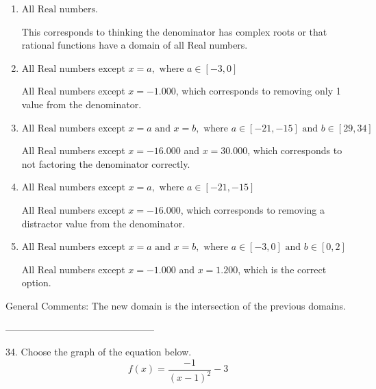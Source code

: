 \documentclass{article}[14pt]
\begin{document}
\begin{enumerate}[label=\Alph*.] 
\item $ \text{All Real numbers.} $ 

 This corresponds to thinking the denominator has complex roots or that rational functions have a domain of all Real numbers. 
\item $ \text{All Real numbers except } x = a, \text{ where } a \in [-3, 0] $ 

 All Real numbers except $x = -1.000$, which corresponds to removing only 1 value from the denominator. 
\item $ \text{All Real numbers except } x = a \text{ and } x = b, \text{ where } a \in [-21, -15] \text{ and } b \in [29, 34] $ 

 All Real numbers except $x = -16.000$ and $x = 30.000$, which corresponds to not factoring the denominator correctly. 
\item $ \text{All Real numbers except } x = a, \text{ where } a \in [-21, -15] $ 

 All Real numbers except $x = -16.000$, which corresponds to removing a distractor value from the denominator. 
\item $ \text{All Real numbers except } x = a \text{ and } x = b, \text{ where } a \in [-3, 0] \text{ and } b \in [0, 2] $ 

 All Real numbers except $x = -1.000$ and $x = 1.200$, which is the correct option. 
\end{enumerate} 
 
General Comments: The new domain is the intersection of the previous domains.

-----------------------------------------------

34. Choose the graph of the equation below.
$$ f(x) = \frac{-1}{(x - 1)^2} - 3 $$ 
\end{document}
